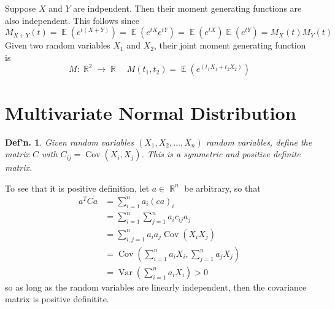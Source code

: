 \documentclass[12pt, a4paper]{book}
\DeclareMathOperator{\R}{\mathbb{R}}
\DeclareMathOperator{\E}{\mathbb{E}}
\DeclareMathOperator{\Var}{Var}
\DeclareMathOperator{\Cov}{Cov}
\newtheorem{definition}[theorem]{Def'n.}
\theoremstyle{nonumberplain}
\begin{document}
Suppose $X$ and $Y$ are indpendent.
Then their moment generating functions are also independent.
This follows since
\[M_{X+Y}(t)=\E(e^{t(X+Y)})=\E(e^{tX}e^{tY})=\E(e^{tX})\E(e^{tY})=M_X(t)M_Y(t)\]
Given two random variables $X_1$ and $X_2$, their joint moment generating function is
\[M:\R^2\to\R\quad M(t_1,t_2)=\E(e^{(t_1X_1+t_2X_2)})\]
\section{Multivariate Normal Distribution}
\begin{definition}
    Given random variables $(X_1,X_2,\ldots,X_n)$ random variables, define the matrix $C$ with $C_{ij}=\Cov(X_i,X_j)$.
    This is a symmetric and positive definite matrix.
\end{definition}
To see that it is positive definition, let $a\in\R^n$ be arbitrary, so that
\begin{align*}
    a^TCa &= \sum\limits_{i=1}^n a_i(ca)_i\\
          &= \sum\limits_{i=1}^n\sum\limits_{j=1}^n a_i c_{ij}a_j\\
          &= \sum\limits_{i,j=1}^n a_i a_j\Cov(X_iX_j)\\
          &= \Cov\left(\sum\limits_{i=1}^n a_iX_i,\sum\limits_{j=1}^n a_jX_j\right)\\
          &= \Var\left(\sum\limits_{i=1}^n a_iX_i\right)>0
\end{align*}
so as long as the random variables are linearly independent, then the covariance matrix is positive definitite.
\end{document}
